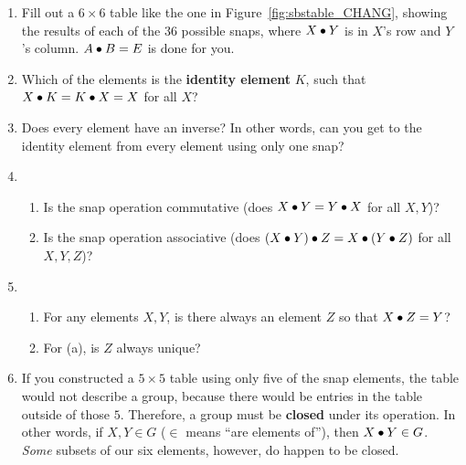 \documentclass[../gatm.tex]{subfiles}
\begin{document}
\begin{enumerate}
	\item Fill out a $6\times 6$ table like the one in Figure~\ref{fig:sbstable_CHANG}, showing the results of each of the $36$ possible snaps, where $X\bullet Y$ is in $X$'s row and $Y$'s column. %
	      $A\bullet B=E$ is done for you.
	\item Which of the elements is the \textbf{identity element} $K$, such that $X\bullet K = K\bullet X = X$ for all $X$? \label{prob:group_definition_start}
	\item Does every element have an inverse? In other words, can you get to the identity element from every element using only one snap?
	\item \begin{enumerate}
		      \item Is the snap operation commutative (does $X \bullet Y = Y \bullet X$ for all $X,Y$)?
		      \item Is the snap operation associative (does $(X \bullet Y) \bullet Z = X \bullet (Y\bullet Z)$ for all $X,Y,Z$)?
	      \end{enumerate}
	\item \begin{enumerate}
		      \item For any elements $X, Y$, is there always an element $Z$ so that $X\bullet Z=Y$?
		      \item For (a), is $Z$ always unique?
	      \end{enumerate}
	\item If you constructed a $5\times 5$ table using only five of the snap elements, the table would not describe a group, because there would be entries in the table outside of those $5$.
	      Therefore, a group must be \textbf{closed} under its operation. In other words, if $X,Y\in G$ ($\in$ means ``are elements of''), then $X\bullet Y\in G$.
	      \textit{Some} subsets of our six elements, however, do happen to be closed.


\end{enumerate}
\end{document}

